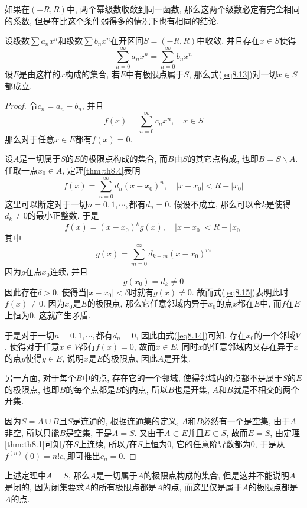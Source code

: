 \documentclass[cn,12pt,math=mtpro2,citestyle=gb7714-2015,bibstyle=gb7714-2015,twocol]{elegantbook}
\begin{document}
如果在$(-R,R)$中, 两个幂级数收敛到同一函数, 那么这两个级数必定有完全相同的系数, 但是在比这个条件弱得多的情况下也有相同的结论.
\begin{theorem}
  设级数$\sum a_nx^n$和级数$\sum b_nx^n$在开区间$S=(-R,R)$中收敛, 并且存在$x\in S$使得
  \begin{equation}\label{eq8.13}
    \sum_{n=0}^{\infty}a_nx^n=\sum_{n=0}^{\infty}b_nx^n
  \end{equation}
  设$E$是由这样的$x$构成的集合, 若$E$中有极限点属于$S$, 那么式(\ref{eq8.13})对一切$x\in S$都成立.
\end{theorem}
\begin{proof}
  令$c_n=a_n-b_n$, 并且
  $$f(x)=\sum_{n=0}^{\infty}c_nx^n,\quad x\in S$$
  那么对于任意$x\in E$都有$f(x)=0$.

  设$A$是一切属于$S$的$E$的极限点构成的集合, 而$B$由$S$的其它点构成, 也即$B=S\backslash A$. 任取一点$x_0\in A$, 定理\ref{thm:th8.4}表明
  \begin{equation}\label{eq8.14}
    f(x)=\sum_{n=0}^{\infty}d_n(x-x_0)^n,\quad |x-x_0|<R-|x_0|
  \end{equation}
   这里可以断定对于一切$n=0,1,\cdots,$都有$d_n=0$. 假设不成立, 那么可以令$k$是使得$d_k\neq 0$的最小正整数. 于是
  \begin{equation}\label{eq8.15}
    f(x)=(x-x_0)^kg(x),\quad |x-x_0|<R-|x_0|
  \end{equation}
  其中
  $$g(x)=\sum_{m=0}^{\infty}d_{k+m}(x-x_0)^m$$
  因为$g$在点$x_0$连续, 并且
  $$g(x_0)=d_k\neq 0$$
   因此存在$\delta>0$, 使得当$|x-x_0|<\delta$时就有$g(x)\neq 0$. 故而式(\ref{eq8.15})表明此时$f(x)\neq 0$. 因为$x_0$是$E$的极限点, 那么它任意邻域内异于$x_0$的点$x$都在$E$中, 而$f$在$E$上恒为0, 这就产生矛盾.

  于是对于一切$n=0,1,\cdots,$都有$d_n=0$, 因此由式(\ref{eq8.14})可知, 存在$x_0$的一个邻域$V$, 使得对于任意$x\in V$都有$f(x)=0$, 故而$x\in E$, 同时$x$的任意邻域内又存在异于$x$的点$y$使得$y\in E$, 说明$x$是$E$的极限点, 因此$A$是开集.

  另一方面, 对于每个$B$中的点, 存在它的一个邻域, 使得邻域内的点都不是属于$S$的$E$的极限点, 也即$B$的每个点都是$B$的内点, 所以$B$也是开集, $A$和$B$就是不相交的两个开集.

  因为$S=A\cup B$且$S$是连通的, 根据连通集的定义, $A$和$B$必然有一个是空集, 由于$A$非空, 所以只能$B$是空集, 于是$A=S$. 又由于$A\subset E$并且$E\subset S$, 故而$E=S$, 由定理\ref{thm:th8.1}可知$f$在$S$上连续, 所以$f$在$S$上恒为0, 它的任意阶导数都为0, 于是从$f^{(n)}(0)=n!c_n$即可推出$c_n=0$.
\end{proof}
\begin{remark}
上述定理中$A=S$, 那么$A$是一切属于$A$的极限点构成的集合, 但是这并不能说明$A$是闭的, 因为闭集要求$A$的所有极限点都是$A$的点, 而这里仅是属于$A$的极限点都是$A$的点.
\end{remark}
\end{document}
